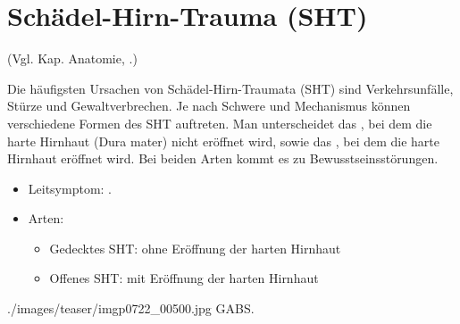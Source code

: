 









\clearpage
\section{Schädel-Hirn-Trauma (SHT)}


(Vgl. Kap. Anatomie, .)





{
Die häufigsten Ursachen von Schädel-Hirn-Traumata (SHT) sind Verkehrsunfälle, 
Stürze und Gewaltverbrechen. Je nach Schwere und Mechanismus können
verschiedene  Formen des SHT auftreten. Man unterscheidet das 
, bei dem die harte Hirnhaut (Dura mater) nicht eröffnet wird,
sowie das , bei dem die harte Hirnhaut eröffnet wird. Bei beiden
Arten kommt es zu Bewusstseinsstörungen. 

{\vspace{1cm}}

}{
\begin{itemize}
  \item Leitsymptom: .
  \item Arten:
  \begin{itemize}
    \item Gedecktes SHT: ohne  Eröffnung der harten Hirnhaut
    \item Offenes SHT: mit  Eröffnung der harten Hirnhaut
  \end{itemize}
\end{itemize}

}
{./images/teaser/imgp0722_00500.jpg}
{}
{GABS.}


